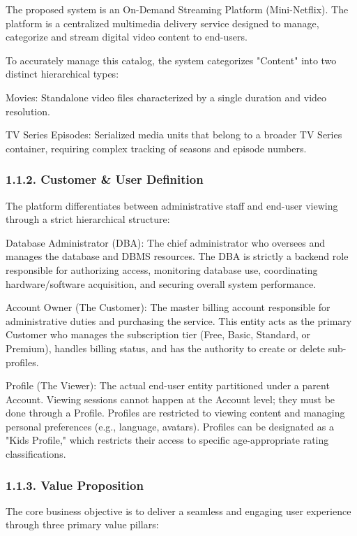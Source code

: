 The proposed system is an On-Demand Streaming Platform (Mini-Netflix). The platform is a centralized multimedia delivery service designed to manage, categorize and stream digital video content to end-users.

To accurately manage this catalog, the system categorizes "Content" into two distinct hierarchical types:

Movies: Standalone video files characterized by a single duration and video resolution.

TV Series Episodes: Serialized media units that belong to a broader TV Series container, requiring complex tracking of seasons and episode numbers.

\subsubsection*{1.1.2. Customer \& User Definition}

The platform differentiates between administrative staff and end-user viewing through a strict hierarchical structure:

Database Administrator (DBA): The chief administrator who oversees and manages the database and DBMS resources. The DBA is strictly a backend role responsible for authorizing access, monitoring database use, coordinating hardware/software acquisition, and securing overall system performance.

Account Owner (The Customer): The master billing account responsible for administrative duties and purchasing the service. This entity acts as the primary \textquotesingle Customer\textquotesingle{} who manages the subscription tier (Free, Basic, Standard, or Premium), handles billing status, and has the authority to create or delete sub-profiles.

Profile (The Viewer): The actual end-user entity partitioned under a parent Account. Viewing sessions cannot happen at the Account level; they must be done through a Profile. Profiles are restricted to viewing content and managing personal preferences (e.g., language, avatars). Profiles can be designated as a "Kids Profile," which restricts their access to specific age-appropriate rating classifications.

\subsubsection*{1.1.3. Value Proposition}

The core business objective is to deliver a seamless and engaging user experience through three primary value pillars:

